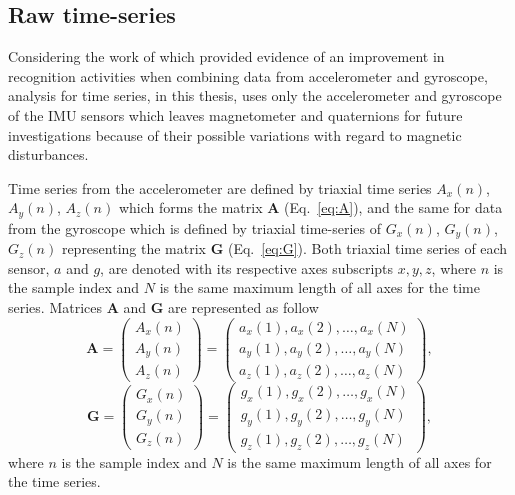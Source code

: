 \subsection{Raw time-series}
Considering the work of \cite{shoaib2016} which provided evidence 
of an improvement in recognition activities when combining data 
from accelerometer and gyroscope, analysis for time series, in this thesis, 
uses only the accelerometer and gyroscope of the IMU sensors which leaves 
magnetometer and quaternions for future investigations because of 
their possible variations with regard to magnetic disturbances.

Time series from the accelerometer are defined by triaxial time series 
$A_x(n)$, $A_y(n)$, $A_z(n)$ which forms the matrix $\boldsymbol{A}$ 
(Eq.~\ref{eq:A}), and the same for data from the gyroscope which is 
defined by triaxial time-series of $G_x(n)$, $G_y(n)$, $G_z(n)$ representing 
the matrix $\boldsymbol{G}$ (Eq.~\ref{eq:G}). Both triaxial time series of 
each sensor, $a$ and $g$, are denoted with its respective axes 
subscripts $x,y,z$, where $n$ is the sample index  and $N$ is the same 
maximum length of all axes for the time series.
Matrices  $\boldsymbol{A}$ and $\boldsymbol{G}$ are represented as follow
\begin{equation}\label{eq:A}
\boldsymbol{A} =
\begin{pmatrix}
  A_x(n) \\
  A_y(n) \\
  A_z(n)
\end{pmatrix}
=
\begin{pmatrix}
 a_x(1),a_x(2),\dots,a_x(N) \\
 a_y(1),a_y(2),\dots,a_y(N) \\
 a_z(1),a_z(2),\dots,a_z(N) 
\end{pmatrix},
\end{equation}
\begin{equation}\label{eq:G}
\boldsymbol{G} =
\begin{pmatrix}
 G_x(n) \\
 G_y(n) \\
 G_z(n)
\end{pmatrix}
=
\begin{pmatrix}
 g_x(1),g_x(2),\dots,g_x(N) \\
 g_y(1),g_y(2),\dots,g_y(N) \\
 g_z(1),g_z(2),\dots,g_z(N) 
\end{pmatrix},
\end{equation}
where $n$ is the sample index  and $N$ is the same maximum length of all axes 
for the time series.


